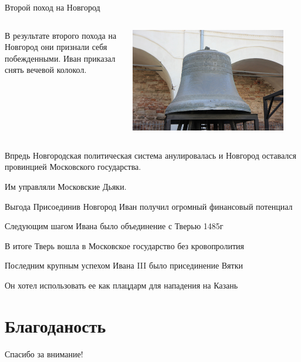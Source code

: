 \begin{frame}{Второй поход на Новгород}
	\begin{columns}
		\begin{column}{0.45\textwidth}

			В результате второго похода на Новгород они признали себя побежденными. Иван приказал снять вечевой колокол.

		\end{column}

		\begin{column}{0.45\textwidth}
			\includegraphics[width=0.9\textwidth]{images/ivan-2}
		\end{column}
	\end{columns}
\end{frame}

\begin{frame}{}

	Впредь Новгородская политическая система анулировалась и Новгород оставался провинцией Московского государства.

	Им управляли Московские Дьяки.
\end{frame}
\begin{frame}{Выгода}
	Присоединив Новгород Иван получил огромный финансовый потенциал
\end{frame}
\begin{frame}{}
	Следующим шагом Ивана было объединение с Тверью 1485г

	В итоге Тверь вошла в Московское государство без кровопролития
\end{frame}
\begin{frame}{}
	Последним крупным успехом Ивана III было присединение Вятки

	Он хотел использовать ее как плацдарм для нападения на Казань
\end{frame}

\section{Благоданость}
\begin{frame}
	\centering
	\huge
	Спасибо за внимание!
\end{frame}



